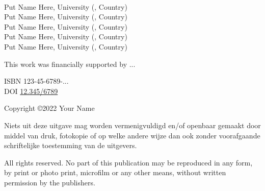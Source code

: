 \thispagestyle{empty}

\noindent \myProf \\
\myOtherProf \par
\bigskip
{}
\noindent \mySupervisor \par
\bigskip
{}
\noindent Put Name Here, University (, Country) \\
Put Name Here, University (, Country) \\
Put Name Here, University (, Country) \\
Put Name Here, University (, Country) \\
Put Name Here, University (, Country) \par
\bigskip
\bigskip
\bigskip
\noindent This work was financially supported by ... \par
\vfill
\noindent ISBN 123-45-6789-... \\
DOI \href{https://doi.org/12.345/6789}{12.345/6789} \par
\bigskip
\noindent Copyright \copyright 2022 Your Name \par
\bigskip
\noindent Niets uit deze uitgave mag worden vermenigvuldigd en/of openbaar gemaakt door middel van druk,
fotokopie of op welke andere wijze dan ook zonder voorafgaande schriftelijke toestemming van
de uitgevers.\par
\bigskip
\noindent All rights reserved. No part of this publication may be reproduced in any form, by print or
photo print, microfilm or any other means, without written permission by the publishers.
